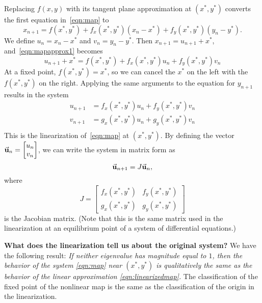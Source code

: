 Replacing $f(x,y)$ with its tangent plane
approximation at $(x^*,y^*)$ converts the first equation in~\eqref{eqn:map}
to
\begin{equation}
  x_{n+1} = f(x^*,y^*) + f_x(x^*,y^*)(x_n-x^*) + f_y(x^*,y^*)(y_n-y^*).
\label{eqn:mapapprox1}
\end{equation}
We define $u_n = x_n - x^*$ and
$v_n = y_n - y^*$.  Then $x_{n+1} = u_{n+1} + x^*$, and~\eqref{eqn:mapapprox1}
becomes
\begin{equation}
   u_{n+1} + x^* = f(x^*,y^*) + f_x(x^*,y^*)u_n + f_y(x^*,y^*)v_n
\end{equation}
At a fixed point, $f(x^*,y^*) = x^*$, so we can cancel the $x^*$ on the
left with the $f(x^*,y^*)$ on the right.  Applying the same arguments
to the equation for $y_{n+1}$ results in the system
\begin{equation}
\begin{split}
   u_{n+1} & = f_x(x^*,y^*)u_n + f_y(x^*,y^*)v_n \\
   v_{n+1} & = g_x(x^*,y^*)u_n + g_y(x^*,y^*)v_n \\
\end{split}
\end{equation}
This is the linearization
of~\eqref{eqn:map} at $(x^*,y^*)$.
By defining the vector $\vec{\textbf{u}}_n = \begin{bmatrix} u_n \\ v_n \end{bmatrix}$,
we can write the system in matrix form as
\begin{equation}
  \vec{\textbf{u}}_{n+1} = J\vec{\textbf{u}}_n,
\label{eqn:linearizedmap}
\end{equation}
where
\begin{equation}
   J = \begin{bmatrix}
             f_x(x^*,y^*) & f_y(x^*,y^*) \\
	     g_x(x^*,y^*) & g_y(x^*,y^*)
       \end{bmatrix}
\label{eqn:mapjac}
\end{equation}
is the Jacobian matrix.
(Note that this is the same matrix used in the linearization
at an equilibrium point of a system of differential equations.)

\noindent
\textbf{What does the linearization tell us about the original system?}
We have the following result:
\emph{If neither eigenvalue has magnitude equal to $1$,
then the behavior of the system \eqref{eqn:map}
near $(x^*,y^*)$ is qualitatively the same as the behavior of the
linear approximation \eqref{eqn:linearizedmap}.}
The classification of the fixed point of the nonlinear map
is the same as the classification of the origin in the linearization.


